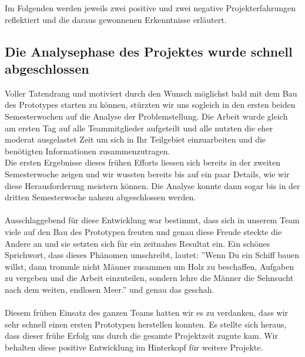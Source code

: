 Im  Folgenden werden jeweils zwei positive und zwei negative Projekterfahrungen reflektiert und die daraus gewonnenen Erkenntnisse erläutert.

\subsection{Die Analysephase des Projektes wurde schnell abgeschlossen}

Voller Tatendrang und motiviert durch den Wunsch möglichst bald mit dem Bau des Prototypes starten zu können, stürzten wir uns sogleich in den ersten beiden Semesterwochen auf die Analyse der Problemstellung. Die Arbeit wurde gleich am ersten Tag auf alle Teammitglieder aufgeteilt und alle nutzten die eher moderat ausgelastet Zeit um sich in Ihr Teilgebiet einzuarbeiten und die benötigten Informationen zusammenzutragen.\\
Die ersten Ergebnisse dieses frühen Efforts liessen sich bereits in der zweiten Semesterwoche zeigen und wir wussten bereits bis auf ein paar Details, wie wir diese Herausforderung meistern können. Die Analyse konnte dann sogar bis in der dritten Semesterwoche nahezu abgeschlossen werden.\\
\\
Ausschlaggebend für diese Entwicklung war bestimmt, dass sich in unserem Team viele auf den Bau des Prototypen freuten und genau diese Freude steckte die Andere an und sie setzten sich für ein zeitnahes Resultat ein. Ein schönes Sprichwort, dass dieses Phänomen umschreibt, lautet:  ''Wenn Du ein Schiff bauen willst, dann trommle nicht Männer zusammen um Holz zu beschaffen, Aufgaben zu vergeben und die Arbeit einzuteilen, sondern lehre die Männer die Sehnsucht nach dem weiten, endlosen Meer.'' \cite{SCHIFF} und genau das geschah.\\
\\
Diesem frühen Einsatz des ganzen Teams hatten wir es zu verdanken, dass wir sehr schnell einen ersten Prototypen herstellen konnten. Es stellte sich heraus, dass dieser frühe Erfolg uns durch die gesamte Projektzeit zugute kam. Wir behalten diese positive Entwicklung im Hinterkopf für weitere Projekte.
